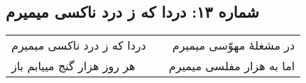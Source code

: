 \begin{center}
\section*{شماره ۱۳: دردا که ز درد ناکسی میمیرم}
\label{sec:013}
\begin{longtable}{l p{0.5cm} r}
دردا که ز درد ناکسی میمیرم
&&
در مشغلهٔ مهوّسی میمیرم
\\
هر روز هزار گنج مییابم باز
&&
اما به هزار مفلسی میمیرم
\\
\end{longtable}
\end{center}
